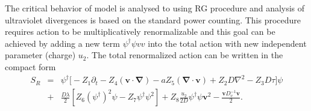 The critical behavior of model is analysed to using RG procedure
and analysis of ultraviolet divergences is based on the standard power counting\cite{Vasiliev}. This procedure requires 
 action to be multiplicatively renormalizable and this goal can be achieved by 
 adding a new term $\psi^{\dagger}\psi vv$ into the total action with new 
 independent parameter (charge) $u_2$. The total renormalized action can be written 
 in the compact form
\begin{eqnarray}
  S_R & = & \psi^\dagger\biggl[
  -Z_1\partial_t - Z_4 (\bm{v}\cdot \bm{\nabla}) -a Z_5 (\bm{\nabla}\cdot\bm{v}) 
  +Z_2 D\nabla^2 - Z_3 D\tau \biggl] \psi \nonumber \\
  & + & \frac{D\lambda}{2}[Z_6(\psi^\dagger)^2\psi-Z_7\psi^\dagger
  \psi^2]+Z_8\frac{u_2}{2D}\psi^\dagger\psi \bm{v}^2 -
   \frac{\bm{v}D_v^{-1}\bm{v}}{2}.
\end{eqnarray}

